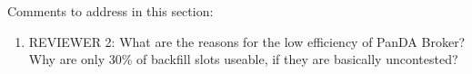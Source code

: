 \ifreview
Comments to address in this section:
\begin{enumerate}
    \color{red} 
    
    \item REVIEWER 2: What are the reasons for the low efficiency of PanDA
    Broker? Why are only 30\% of backfill slots useable, if they are basically
    uncontested? 
    
    



    
    

\end{enumerate}
